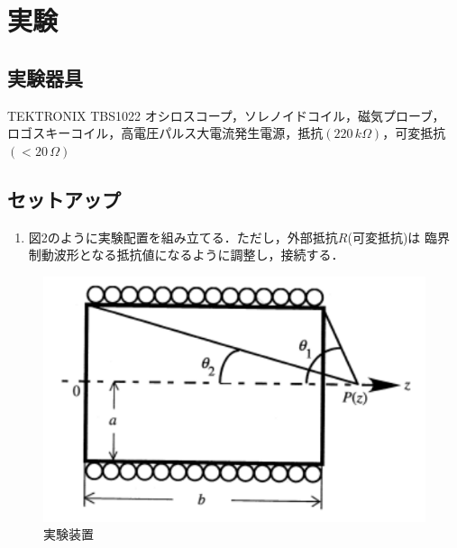 
\section{実験}

\subsection{実験器具}
TEKTRONIX TBS1022 オシロスコープ，ソレノイドコイル，磁気プローブ，
ロゴスキーコイル，高電圧パルス大電流発生電源，抵抗$(220\,\si{k\Omega})$，可変抵抗$(<20\,\si{\Omega})$

\subsection{セットアップ}
\begin{enumerate}
    \item 図2のように実験配置を組み立てる．ただし，外部抵抗$R$(可変抵抗)は
    臨界制動波形となる抵抗値になるように調整し，接続する．
\end{enumerate}
\begin{figure}[!ht]
    \centering
    \includegraphics[scale=1]{figure2.pdf}
    \caption{実験装置}
\end{figure}

\newpage

